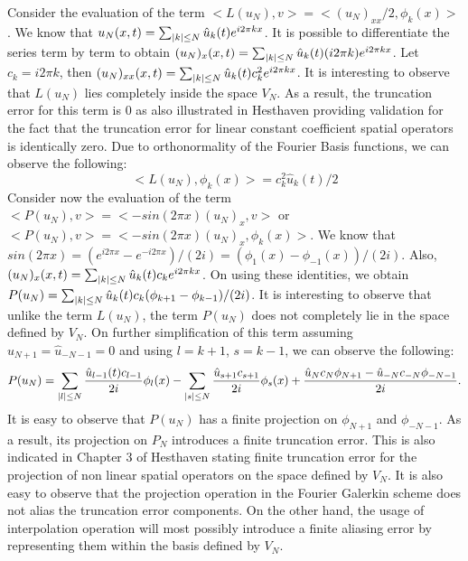 \documentclass[12pt,dvipsnames]{article}
\DeclarePairedDelimiter\abs{\lvert}{\rvert}
\begin{document}
Consider the evaluation of the term $<L(u_N), v> = <(u_N)_{xx}/2, \phi_k(x)>$. We know that $ u_N(x, t) = \sum_{\abs{k} \leq N} \hat{u}_k(t) e^{i2 \pi kx}$. It is possible to differentiate the series term by term to obtain $(u_N)_{x}(x, t) = \sum_{\abs{k} \leq N} \hat{u}_k(t) (i 2 \pi k) e^{i2 \pi kx}$. Let $c_k = i2 \pi k$, then $(u_N)_{xx}(x, t) = \sum_{\abs{k} \leq N} \hat{u}_k(t) c_k^2 e^{i2 \pi kx}$. It is interesting to observe that $L(u_N)$ lies completely inside the space $V_N$. As a result, the truncation error for this term is $0$ as also illustrated in Hesthaven providing validation for the fact that the truncation error for linear constant coefficient spatial operators is identically zero. Due to orthonormality of the Fourier Basis functions, we can observe the following:
\begin{equation}
    <L(u_N), \phi_k(x)> =c_k^2 \hat{u}_k(t)/2
    \label{LuN}
\end{equation}
Consider now the evaluation of the term $<P(u_N), v> = <-sin(2 \pi x)(u_N)_x, v>$ or $<P(u_N), v> = <-sin(2 \pi x)(u_N)_x, \phi_k(x)>$. We know that $sin(2 \pi x) = (e^{i 2 \pi x} - e^{-i 2 \pi x})/(2i) = (\phi_1(x) - \phi_{-1}(x))/(2i)$. Also, $(u_N)_{x}(x, t) = \sum_{\abs{k} \leq N}  \hat{u}_k(t) c_k e^{i2 \pi kx}$. On using these identities, we obtain $P(u_N) = \sum_{\abs{k} \leq N} \hat{u}_k(t) c_k (\phi_{k + 1} - \phi_{k - 1})/(2i)$. It is interesting to observe that unlike the term $L(u_N)$, the term $P(u_N)$ does not completely lie in the space defined by $V_N$. On further simplification of this term assuming $\hat{u}_{N + 1} = \hat{u}_{-N - 1} = 0$ and using $l = k + 1$, $s = k  - 1$, we can observe the following:
\begin{equation}
    P(u_N) = \sum_{\abs{l} \leq N} \frac{ \hat{u}_{l - 1}(t) c_{l - 1} }{2i} \phi_l(x) - \sum_{\abs{s} \leq N} \frac{\hat{u}_{s + 1} c_{s + 1}}{2i} \phi_s(x) + \frac{ \hat{u}_{N} c_{N} \phi_{N + 1} - \hat{u}_{-N} c_{-N} \phi_{-N - 1} }{2i}. 
    \label{PuN}
\end{equation}
It is easy to observe that $P(u_N)$ has a finite projection on $\phi_{N + 1}$ and $\phi_{-N - 1}$. As a result, its projection on $P_N$ introduces a finite truncation error. This is also indicated in Chapter $3$ of Hesthaven stating finite truncation error for the projection of non linear spatial operators on the space defined by $V_N$. It is also easy to observe that the projection operation in the Fourier Galerkin scheme does not alias the truncation error components. On the other hand, the usage of interpolation operation will most possibly introduce a finite aliasing error by representing them within the basis defined by $V_N$.
\end{document}
